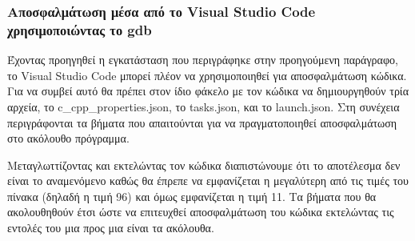 \subsubsection*{Αποσφαλμάτωση μέσα από το Visual Studio Code χρησιμοποιώντας το gdb}
Έχοντας προηγηθεί η εγκατάσταση που περιγράφηκε στην προηγούμενη παράγραφο, το Visual Studio Code μπορεί πλέον να χρησιμοποιηθεί για αποσφαλμάτωση κώδικα. Για να συμβεί αυτό θα πρέπει στον ίδιο φάκελο με τον κώδικα να δημιουργηθούν τρία αρχεία, το c\_cpp\_properties.json, το tasks.json, και το launch.json. Στη συνέχεια περιγράφονται τα βήματα που απαιτούνται για να πραγματοποιηθεί αποσφαλμάτωση στο ακόλουθο πρόγραμμα.  



Μεταγλωττίζοντας και εκτελώντας τον κώδικα διαπιστώνουμε ότι το αποτέλεσμα δεν είναι το αναμενόμενο καθώς θα έπρεπε να εμφανίζεται η μεγαλύτερη από τις τιμές του πίνακα (δηλαδή η τιμή 96) και όμως εμφανίζεται η τιμή 11. Τα βήματα που θα ακολουθηθούν έτσι ώστε να επιτευχθεί αποσφαλμάτωση του κώδικα εκτελώντας τις εντολές του μια προς μια είναι τα ακόλουθα.

